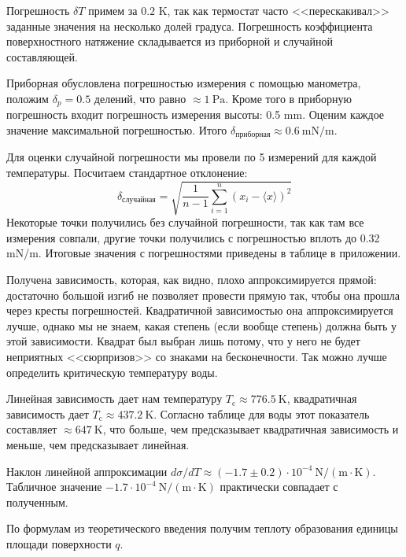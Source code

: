 \documentclass[a4paper,12pt]{report}
\begin{document}
\begin{multicols}{2}
        Погрешность $\delta T$ примем за $0.2$ K, так как термостат часто <<перескакивал>> заданные значения на несколько долей градуса. Погрешность коэффициента поверхностного натяжение складывается из приборной и случайной составляющей.
        
        Приборная обусловлена погрешностью измерения с помощью манометра, положим $\delta_p=0.5$ делений, что равно $\approx 1 \ \text{Pa}$. Кроме того в приборную погрешность входит погрешность измерения высоты: 0.5 mm. Оценим каждое значение максимальной погрешностью. Итого $\delta_\text{приборная}\approx 0.6 \ \text{mN}/\text{m}$.

        Для оценки случайной погрешности мы провели по 5 измерений для каждой температуры. Посчитаем стандартное отклонение:
        \begin{equation*}
            \delta_\text{случайная}=\sqrt{\frac{1}{n-1}\sum_{i=1}^{n}(x_i-\langle x \rangle)^2}
        \end{equation*}
        Некоторые точки получились без случайной погрешности, так как там все измерения совпали, другие точки получились с погрешностью вплоть до 0.32 mN/m. Итоговые значения с погрешностями приведены в таблице в приложении.

        
        Получена зависимость, которая, как видно, плохо аппроксимируется прямой: достаточно большой изгиб не позволяет провести прямую так, чтобы она прошла через кресты погрешностей. Квадратичной зависимостью она аппроксимируется лучше, однако мы не знаем, какая степень (если вообще степень) должна быть у этой зависимости. Квадрат был выбран лишь потому, что у него не будет неприятных <<сюрпризов>> со знаками на бесконечности. Так можно лучше определить критическую температуру воды.

        Линейная зависимость дает нам температуру $T_\text{c}\approx 776.5 \ \text{K}$, квадратичная зависимость дает $T_\text{c}\approx 437.2 \ \text{K}$. Согласно таблице для воды этот показатель составляет $\approx 647 \ \text{K}$, что больше, чем предсказывает квадратичная зависимость и меньше, чем предсказывает линейная.

        Наклон линейной аппроксимации $d\sigma/dT\approx (-1.7\pm0.2)\cdot 10^{-4} \ \text{N}/(\text{m}\cdot\text{K})$. Табличное значение $-1.7\cdot 10^{-4}\ \text{N}/(\text{m}\cdot \text{K})$ практически совпадает с полученным.

        По формулам из теоретического введения получим теплоту образования единицы площади поверхности $q$.

    \end{multicols}
\end{document}
